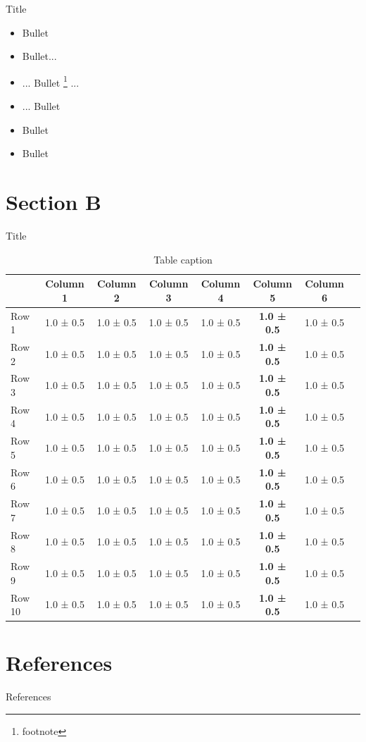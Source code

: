 \documentclass[8pt, aspectratio=169]{beamer} %
\begin{document}
\begin{frame}{Title}

    \begin{itemize}
        \item Bullet
        \vspace{15pt}
        \item Bullet...
        \item[ ] ... Bullet \footnote{footnote}  ...
        \item[ ] \hspace{10pt} ... Bullet
        \vspace{15pt}
        \item Bullet
        \item Bullet
    \end{itemize}
\end{frame}


\section{Section B}

\begin{frame}{Title}
    \vspace{10pt}
    \begin{table}
    \centering
    \begin{tabular}{lccccccc} 
        \toprule
        & Column 1 & Column 2 & Column 3 & Column 4 & Column 5 & Column 6 \\ 
        \midrule
        Row 1 & 1.0 ± 0.5  & 1.0 ± 0.5 & 1.0 ± 0.5 & 1.0 ± 0.5 & \textbf{1.0 ± 0.5} & 1.0 ± 0.5 \\
        Row 2 & 1.0 ± 0.5  & 1.0 ± 0.5 & 1.0 ± 0.5 & 1.0 ± 0.5 & \textbf{1.0 ± 0.5} & 1.0 ± 0.5 \\
        Row 3 & 1.0 ± 0.5  & 1.0 ± 0.5 & 1.0 ± 0.5 & 1.0 ± 0.5 & \textbf{1.0 ± 0.5} & 1.0 ± 0.5 \\
        Row 4 & 1.0 ± 0.5  & 1.0 ± 0.5 & 1.0 ± 0.5 & 1.0 ± 0.5 & \textbf{1.0 ± 0.5} & 1.0 ± 0.5 \\
        Row 5 & 1.0 ± 0.5  & 1.0 ± 0.5 & 1.0 ± 0.5 & 1.0 ± 0.5 & \textbf{1.0 ± 0.5} & 1.0 ± 0.5 \\
        \midrule
        Row 6 & 1.0 ± 0.5  & 1.0 ± 0.5 & 1.0 ± 0.5 & 1.0 ± 0.5 & \textbf{1.0 ± 0.5} & 1.0 ± 0.5 \\
        Row 7 & 1.0 ± 0.5  & 1.0 ± 0.5 & 1.0 ± 0.5 & 1.0 ± 0.5 & \textbf{1.0 ± 0.5} & 1.0 ± 0.5 \\
        Row 8 & 1.0 ± 0.5  & 1.0 ± 0.5 & 1.0 ± 0.5 & 1.0 ± 0.5 & \textbf{1.0 ± 0.5} & 1.0 ± 0.5 \\
        Row 9 & 1.0 ± 0.5  & 1.0 ± 0.5 & 1.0 ± 0.5 & 1.0 ± 0.5 & \textbf{1.0 ± 0.5} & 1.0 ± 0.5 \\
        Row 10 & 1.0 ± 0.5  & 1.0 ± 0.5 & 1.0 ± 0.5 & 1.0 ± 0.5 & \textbf{1.0 ± 0.5} & 1.0 ± 0.5 \\
        \bottomrule
    \end{tabular}
    \caption{Table caption}
\end{table}
\end{frame}

\section{References}

\begin{frame}[allowframebreaks]{References}
    \printbibliography[heading=none]
\end{frame}
\end{document}
